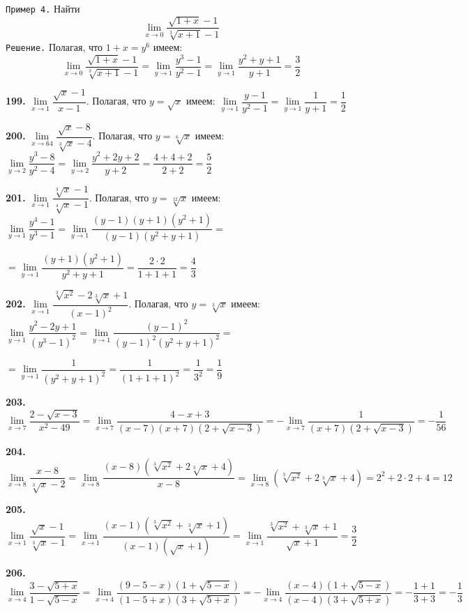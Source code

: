 \documentclass[12pt]{article}
\begin{document}
	
	{\tt Пример 4.} Найти
	\[
		\lim\limits_{x\to0}\dfrac{\sqrt{1+x}-1}{\sqrt[3]{x+1} -1}
	\]
	{\tt Решение.} Полагая, что $1+x=y^6$ имеем:
	\[
		\lim\limits_{x\to0}\dfrac{\sqrt{1+x}-1}{\sqrt[3]{x+1}-1} = \lim\limits_{y\to1} \dfrac{y^3-1}{y^2-1} = \lim\limits_{y\to1} \dfrac{y^2+y+1}{y+1} = \dfrac{3}{2}
	\]
	
	
	\medskip
	{\bf 199.} $\lim\limits_{x\to1}\dfrac{\sqrt{x}-1}{x-1}$. Полагая, что $y=\sqrt{x}$ имеем: $\lim\limits_{y\to1} \dfrac{y-1}{y^2-1} = \lim\limits_{y\to1} \dfrac{1}{y+1} = \dfrac{1}{2}$
	
	\medskip
	{\bf 200.} $\lim\limits_{x\to64} \dfrac{\sqrt{x}-8}{\sqrt[3]{x}-4}$. Полагая, что $y=\sqrt[6]{x}$ имеем: $\lim\limits_{y\to2}\dfrac{y^3-8}{y^2-4} = \lim\limits_{y\to2} \dfrac{y^2+2y+2}{y+2} = \dfrac{4+4+2}{2+2} = \dfrac{5}{2}$
	
	\medskip
	{\bf 201.} $\lim\limits_{x\to1} \dfrac{\sqrt[3]{x}-1}{\sqrt[4]{x}-1}$. Полагая, что $y=\sqrt[12]{x}$ имеем: $\lim\limits_{y\to1}\dfrac{y^4-1}{y^3-1} = \lim\limits_{y\to1} \dfrac{(y-1)(y+1)(y^2+1)}{(y-1)(y^2+y+1)} =$
	
	$
	=\lim\limits_{y\to1}\dfrac{(y+1)(y^2+1)}{y^2+y+1} = \dfrac{2\cdot2}{1+1+1} = \dfrac{4}{3}
	$
	
	\medskip
	{\bf 202.} $\lim\limits_{x\to1}\dfrac{\sqrt[3]{x^2}-2\sqrt[3]{x}+1}{(x-1)^2}$. Полагая, что $y=\sqrt[3]{x}$ имеем: $\lim\limits_{y\to1} \dfrac{y^2-2y+1}{(y^3-1)^2} = \lim\limits_{y\to1}\dfrac{(y-1)^2}{(y-1)^2(y^2+y+1)^2} = $
	
	$
	= \lim\limits_{y\to1} \dfrac{1}{(y^2+y+1)^2} = \dfrac{1}{(1+1+1)^2} = \dfrac{1}{3^2} = \dfrac{1}{9}
	$
	
	
	\medskip
	{\bf 203.} $\lim\limits_{x\to7} \dfrac{2-\sqrt{x-3}}{x^2-49} = \lim\limits_{x\to7} \dfrac{4-x+3}{(x-7)(x+7)(2+\sqrt{x-3})} = -\lim\limits_{x\to7} \dfrac{1}{(x+7)(2+\sqrt{x-3})} = -\dfrac{1}{56}$
	
	\medskip
	{\bf 204.} $\lim\limits_{x\to8}\dfrac{x-8}{\sqrt[3]{x}-2} = \lim\limits_{x\to8} \dfrac{(x-8)(\sqrt[3]{x^2}+2\sqrt[3]{x}+4)}{x-8} = \lim\limits_{x\to8} (\sqrt[3]{x^2}+2\sqrt[3]{x}+4) = 2^2+2\cdot2+4 = 12$
	
	\medskip
	{\bf 205.} $\lim\limits_{x\to1}\dfrac{\sqrt{x}-1}{\sqrt[3]{x}-1} = \lim\limits_{x\to1} \dfrac{(x-1)(\sqrt[3]{x^2}+\sqrt[3]{x}+1)}{(x-1)(\sqrt{x}+1)} = \lim\limits_{x\to1} \dfrac{\sqrt[3]{x^2}+\sqrt[3]{x}+1}{\sqrt{x}+1} = \dfrac{3}{2}$
	
	\medskip
	{\bf 206.} $\lim\limits_{x\to4} \dfrac{3-\sqrt{5+x}}{1-\sqrt{5-x}} = \lim\limits_{x\to4} \dfrac{(9-5-x)(1+\sqrt{5-x})}{(1-5+x)(3+\sqrt{5+x})} = -\lim\limits_{x\to4} \dfrac{(x-4)(1+\sqrt{5-x})}{(x-4)(3+\sqrt{5+x})} = -\dfrac{1+1}{3+3} = -\dfrac{1}{3}$
	
\end{document}
